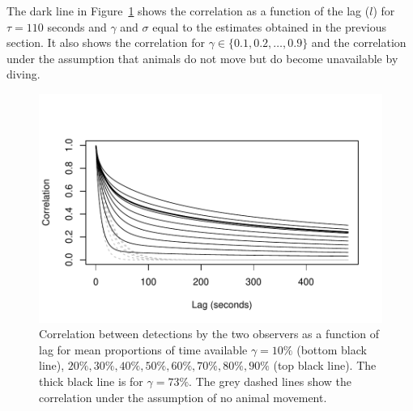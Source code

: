 \documentclass[useAMS, usenatbib, referee]{biom}\usepackage[]{graphicx}\usepackage[]{color}
\makeatletter
\def\maxwidth{ %
  \ifdim\Gin@nat@width>\linewidth
    \linewidth
  \else
    \Gin@nat@width
  \fi
}
\newenvironment{knitrout}{}{} %
\makeatother
\begin{document}


The dark line in Figure~\ref{fig:fig_correlation_plot} shows the correlation as a function of the lag ($l$) for $\tau=110$ seconds and $\gamma$ and $\sigma$ equal to the estimates obtained in the previous section. It also shows the correlation for $\gamma\in\{0.1, 0.2,\ldots,0.9\}$ and the correlation under the assumption that animals do not move but do become unavailable by diving.

\begin{knitrout}
\color{fgcolor}\begin{figure}

{\centering \includegraphics[width=\maxwidth]{figs/fig_correlation_plot-1} 

}

\caption[Correlation between detections by the two observers as a function of lag for mean proportions of time available \(\gamma=10\%\) (bottom black line), \(20\%, 30\%, 40\%, 50\%, 60\%, 70\%, 80\%, 90\%\) (top black line)]{Correlation between detections by the two observers as a function of lag for mean proportions of time available \(\gamma=10\%\) (bottom black line), \(20\%, 30\%, 40\%, 50\%, 60\%, 70\%, 80\%, 90\%\) (top black line). The thick black line is for \(\gamma=73\%\). The grey dashed lines show the correlation under the assumption of no animal movement.}\label{fig:fig_correlation_plot}
\end{figure}


\end{knitrout}
\end{document}
